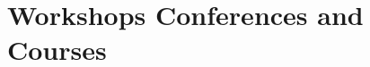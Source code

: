 \documentclass[11pt,a4paper,sans,colorlinks]{moderncv} %
\begin{document}


\section{Workshops Conferences and Courses}
\end{document}
